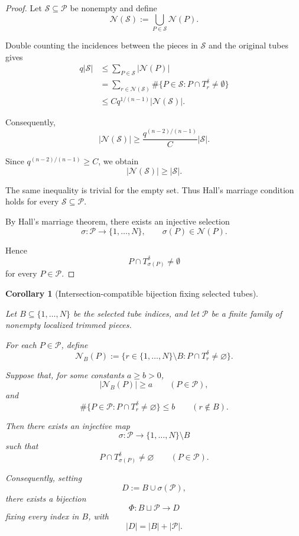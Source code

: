 \documentclass[11pt, letterpaper]{nyjm}
\newtheorem{corollary}[theorem]{Corollary}
\begin{document}
	\begin{proof}
		Let $\mathcal S\subseteq\mathcal P$ be nonempty and define
		\[
		\mathcal N(\mathcal S)
		:=
		\bigcup_{P\in\mathcal S}\mathcal N(P).
		\]
		
		Double counting the incidences between the pieces
		in $\mathcal S$ and the original tubes gives
		\[
		\begin{aligned}
			q|\mathcal S|
			&\le \sum_{P\in\mathcal S}|\mathcal N(P)|\\
			&=
			\sum_{r\in\mathcal N(\mathcal S)}
			\#\{P\in\mathcal S:
			P\cap T_r^\delta\neq\emptyset\}\\
			&\le
			Cq^{1/(n-1)}|\mathcal N(\mathcal S)|.
		\end{aligned}
		\]
		
		Consequently,
		\[
		\boxed{
			|\mathcal N(\mathcal S)|
			\ge
			\frac{q^{(n-2)/(n-1)}}{C}
			|\mathcal S|.
		}
		\]
		
		Since $q^{(n-2)/(n-1)}\ge C$, we obtain
		\[
		|\mathcal N(\mathcal S)|\ge|\mathcal S|.
		\]
		
		The same inequality is trivial for the empty set.
		Thus Hall's marriage condition holds for every
		$\mathcal S\subseteq\mathcal P$.
		
		By Hall's marriage theorem, there exists an
		injective selection
		\[
		\sigma:\mathcal P\longrightarrow\{1,\ldots,N\},
		\qquad
		\sigma(P)\in\mathcal N(P).
		\]
		
		Hence
		\[
		P\cap T_{\sigma(P)}^\delta\neq\emptyset
		\]
		for every $P\in\mathcal P$.
	\end{proof}
	\begin{corollary}[Intersection-compatible bijection fixing selected tubes]
		\label{cor:restricted-intersection-bijection}
		
		Let $B\subseteq\{1,\ldots,N\}$ be the selected tube
		indices, and let $\mathcal P$ be a finite family of
		nonempty localized trimmed pieces.
		
		For each $P\in\mathcal P$, define
		\[
		\mathcal N_B(P)
		:=
		\{r\in\{1,\ldots,N\}\setminus B:
		P\cap T_r^\delta\ne\varnothing\}.
		\]
		
		Suppose that, for some constants $a\ge b>0$,
		\[
		|\mathcal N_B(P)|\ge a
		\qquad(P\in\mathcal P),
		\]
		and
		\[
		\#\{P\in\mathcal P:
		P\cap T_r^\delta\ne\varnothing\}
		\le b
		\qquad(r\notin B).
		\]
		
		Then there exists an injective map
		\[
		\sigma:\mathcal P
		\longrightarrow \{1,\ldots,N\}\setminus B
		\]
		such that
		\[
		P\cap T_{\sigma(P)}^\delta\ne\varnothing
		\qquad(P\in\mathcal P).
		\]
		
		Consequently, setting
		\[
		D:=B\cup\sigma(\mathcal P),
		\]
		there exists a bijection
		\[
		\Phi:B\sqcup\mathcal P\longrightarrow D
		\]
		fixing every index in $B$, with
		\[
		|D|=|B|+|\mathcal P|.
		\]
		
	\end{corollary}
	
\end{document}
